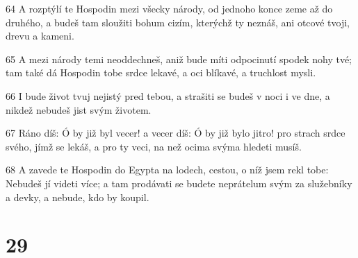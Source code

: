 \par 64 A rozptýlí te Hospodin mezi všecky národy, od jednoho konce zeme až do druhého, a budeš tam sloužiti bohum cizím, kterýchž ty neznáš, ani otcové tvoji, drevu a kameni.
\par 65 A mezi národy temi neoddechneš, aniž bude míti odpocinutí spodek nohy tvé; tam také dá Hospodin tobe srdce lekavé, a oci blíkavé, a truchlost mysli.
\par 66 I bude život tvuj nejistý pred tebou, a strašiti se budeš v noci i ve dne, a nikdež nebudeš jist svým životem.
\par 67 Ráno díš: Ó by již byl vecer! a vecer díš: Ó by již bylo jitro! pro strach srdce svého, jímž se lekáš, a pro ty veci, na než ocima svýma hledeti musíš.
\par 68 A zavede te Hospodin do Egypta na lodech, cestou, o níž jsem rekl tobe: Nebudeš jí videti více; a tam prodávati se budete neprátelum svým za služebníky a devky, a nebude, kdo by koupil.

\chapter{29}

